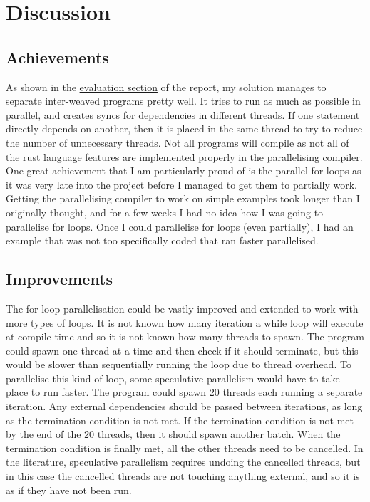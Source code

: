 \chapter{Discussion}
\label{sec:discussion}
\section{Achievements}
As shown in the \hyperref[sec:evaluation]{evaluation section} of the report, my solution manages to separate inter-weaved programs pretty well. It tries to run as much as possible in parallel, and creates syncs for dependencies in different threads. If one statement directly depends on another, then it is placed in the same thread to try to reduce the number of unnecessary threads. Not all programs will compile as not all of the rust language features are implemented properly in the parallelising compiler. One great achievement that I am particularly proud of is the parallel for loops as it was very late into the project before I managed to get them to partially work. Getting the parallelising compiler to work on simple examples took longer than I originally thought, and for a few weeks I had no idea how I was going to parallelise for loops. Once I could parallelise for loops (even partially), I had an example that was not too specifically coded that ran faster parallelised.

\section{Improvements}
The for loop parallelisation could be vastly improved and extended to work with more types of loops. It is not known how many iteration a while loop will execute at compile time and so it is not known how many threads to spawn. The program could spawn one thread at a time and then check if it should terminate, but this would be slower than sequentially running the loop due to thread overhead. To parallelise this kind of loop, some speculative parallelism would have to take place to run faster. The program could spawn $20$ threads each running a separate iteration. Any external dependencies should be passed between iterations, as long as the termination condition is not met. If the termination condition is not met by the end of the $20$ threads, then it should spawn another batch. When the termination condition is finally met, all the other threads need to be cancelled. In the literature, speculative parallelism requires undoing the cancelled threads, but in this case the cancelled threads are not touching anything external, and so it is as if they have not been run.

